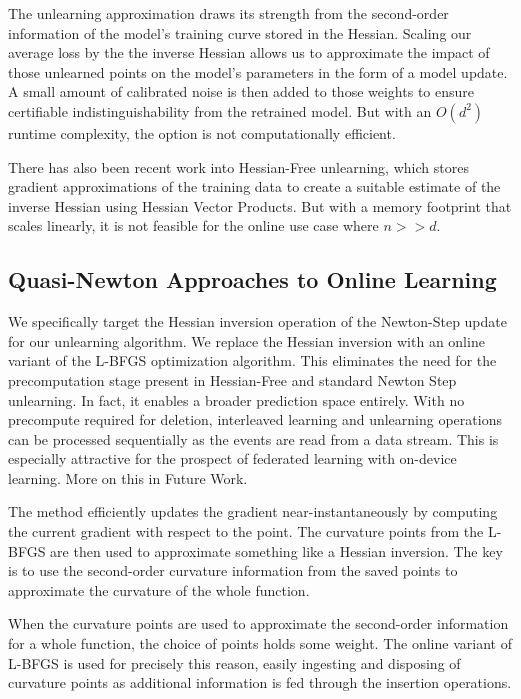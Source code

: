 \documentclass[a4paper,12pt]{article}
\begin{document}
The unlearning approximation draws its strength from the second-order information of the model's training curve stored in the Hessian. Scaling our average loss by the the inverse Hessian allows us to approximate the impact of those unlearned points on the model's parameters in the form of a model update. A small amount of calibrated noise is then added to those weights to ensure certifiable indistinguishability from the retrained model. But with an $O(d^{2})$ runtime complexity, the option is not computationally efficient.

There has also been recent work into Hessian-Free unlearning, which stores gradient approximations of the training data to create a suitable estimate of the inverse Hessian using Hessian Vector Products. But with a memory footprint that scales linearly, it is not feasible for the online use case where $n>>d$.

\subsection{Quasi-Newton Approaches to Online Learning}

We specifically target the Hessian inversion operation of the Newton-Step update for our unlearning algorithm. We replace the Hessian inversion with an online variant of the L-BFGS optimization algorithm. This eliminates the need for the precomputation stage present in Hessian-Free and standard Newton Step unlearning. In fact, it enables a broader prediction space entirely. With no precompute required for deletion, interleaved learning and unlearning operations can be processed sequentially as the events are read from a data stream. This is especially attractive for the prospect of federated learning with on-device learning. More on this in Future Work.

The method efficiently updates the gradient near-instantaneously by computing the current gradient with respect to the point. The curvature points from the L-BFGS are then used to approximate something like a Hessian inversion. The key is to use the second-order curvature information from the saved points to approximate the curvature of the whole function.

When the curvature points are used to approximate the second-order information for a whole function, the choice of points holds some weight. The online variant of L-BFGS is used for precisely this reason, easily ingesting and disposing of curvature points as additional information is fed through the insertion operations.
\end{document}
